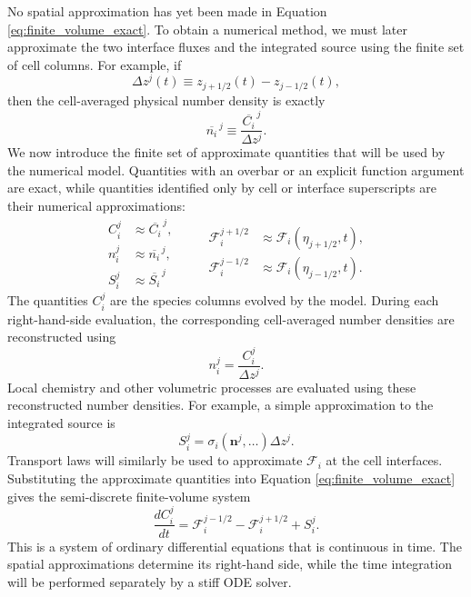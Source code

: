 \documentclass[twocolumn]{aastex631}
\begin{document}
No spatial approximation has yet been made in Equation
\eqref{eq:finite_volume_exact}. To obtain a numerical method, we must later
approximate the two interface fluxes and the integrated source using the
finite set of cell columns. For example, if
\begin{equation}
  \Delta z^j(t)
  \equiv z_{j+1/2}(t)-z_{j-1/2}(t),
\end{equation}
then the cell-averaged physical number density is exactly
\begin{equation}
  \overline{n_i}^{\,j}
  \equiv \frac{\overline{C_i}^{\,j}}{\Delta z^j}.
  \label{eq:cell_average_number_density}
\end{equation}
We now introduce the finite set of approximate quantities that will be used
by the numerical model. Quantities with an overbar or an explicit function argument are
exact, while quantities identified only by cell or interface superscripts are
their numerical approximations:
\begin{equation}
  \begin{aligned}
    C_i^j &\approx \overline{C_i}^{\,j}, \\
    n_i^j &\approx \overline{n_i}^{\,j}, \\
    S_i^j &\approx \overline{S_i}^{\,j}
  \end{aligned}
  \qquad
  \begin{aligned}
    \mathcal{F}_i^{j+1/2}
    &\approx \mathcal{F}_i(\eta_{j+1/2},t), \\
    \mathcal{F}_i^{j-1/2}
    &\approx \mathcal{F}_i(\eta_{j-1/2},t).
  \end{aligned}
  \label{eq:finite_volume_approximations}
\end{equation}
The quantities $C_i^j$ are the species columns evolved by the model. During
each right-hand-side evaluation, the corresponding cell-averaged number
densities are reconstructed using
\begin{equation}
  n_i^j = \frac{C_i^j}{\Delta z^j}.
  \label{eq:number_density_approximation}
\end{equation}
Local chemistry and other volumetric processes are evaluated using these
reconstructed number densities. For example, a simple approximation to the
integrated source is
\begin{equation}
  S_i^j
  =
  \sigma_i\!\left(\bm{n}^{j},\ldots\right)\Delta z^j .
  \label{eq:source_approximation}
\end{equation}
Transport laws will similarly be used to approximate $\mathcal{F}_i$ at the
cell interfaces. Substituting the approximate quantities into Equation
\eqref{eq:finite_volume_exact} gives the semi-discrete finite-volume system
\begin{equation}
  \boxed{
  \frac{dC_i^j}{dt}
  =
  \mathcal{F}_i^{j-1/2}
  -\mathcal{F}_i^{j+1/2}
  +S_i^j
  }.
  \label{eq:finite_volume_approximate}
\end{equation}
This is a system of ordinary differential equations that is continuous in
time. The spatial approximations determine its right-hand side, while the
time integration will be performed separately by a stiff ODE solver.
\end{document}
